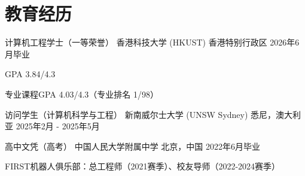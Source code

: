 \vspace{-\acvSectionTopSkip}
\section{教育经历}
\cventry
{计算机工程学士（一等荣誉）} %
{香港科技大学 (HKUST)} %
{香港特别行政区} %
{2026年6月毕业} %
\begin{cvitems}
    \item {GPA 3.84/4.3}
    \item {专业课程GPA 4.03/4.3（专业排名 1/98）}
\end{cvitems}

\cventry
{访问学生（计算机科学与工程）} %
{新南威尔士大学 (UNSW Sydney)} %
{悉尼，澳大利亚} %
{2025年2月 - 2025年5月} %

\cventry
{高中文凭（高考）} %
{中国人民大学附属中学} %
{北京，中国} %
{2022年6月毕业} %
\begin{cvitems}
\item {FIRST机器人俱乐部：总工程师（2021赛季）、校友导师（2022-2024赛季）}
\end{cvitems}
